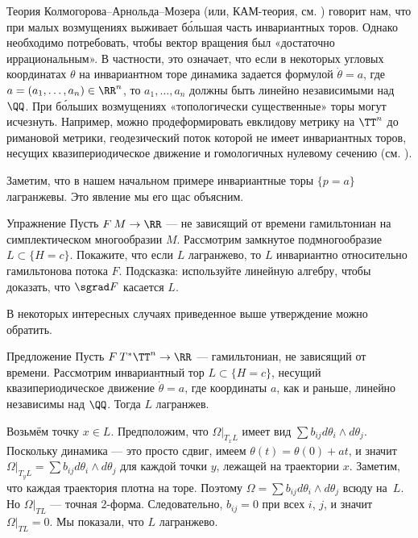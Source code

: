 Теория Колмогорова--Арнольда--Мозера (или, КАМ-теория, см. \cite{Ar}) говорит нам, что при малых возмущениях выживает б\'{о}льшая часть инвариантных торов.
Однако необходимо потребовать, чтобы вектор вращения был «достаточно иррациональным».
В частности, это означает, что если в некоторых угловых координатах $\theta$ на инвариантном торе динамика задается формулой $\dot\theta = a$, где $a = (a_1 ,\dots, a_n) \in \RR^n$, то $a_1 ,\dots, a_n$ должны быть линейно независимыми над $\QQ$.
При б\'{о}льших возмущениях «топологически существенные» торы могут исчезнуть.
Например, можно продеформировать евклидову метрику на $\TT^n$ до римановой метрики, геодезический поток которой не имеет инвариантных торов, несущих квазипериодическое движение и гомологичных нулевому сечению (см. \cite{AL}).

Заметим, что в нашем начальном примере инвариантные торы $\{p = a\}$ лагранжевы.
Это явление мы его щас объясним.

\begin{thm}{Упражнение}\label{8.1.A}
Пусть $F\: M \to \RR$ --- не зависящий от времени гамильтониан на симплектическом многообразии $M$.
Рассмотрим замкнутое подмногообразие $L \subset \{H = c\}$.
Покажите, что если $L$ лагранжево, то $L$ инвариантно относительно гамильтонова потока $F$.
Подсказка: используйте линейную алгебру, чтобы доказать, что $\sgrad F$ касается $L$.
\end{thm}

В некоторых интересных случаях приведенное выше утверждение можно обратить.

\begin{thm}[(\cite{He})]{Предложение}\label{8.1.B}
Пусть $F\: T^\ast \TT^n \to \RR$ --- гамильтониан, не зависящий от времени.
Рассмотрим инвариантный тор $L \subset \{H = c\}$, несущий
квазипериодическое движение $\dot\theta = a$, где координаты $a$, как и раньше, линейно независимы над $\QQ$.
Тогда $L$ лагранжев.
\end{thm}

Возьмём точку $x \in L$.
Предположим, что $\Omega|_{T_x L}$ имеет вид $\sum b_{ij} d\theta_i \wedge d\theta_j$.
Поскольку динамика --- это просто сдвиг, имеем $\theta (t) = \theta (0) + at$, и значит $\Omega|_{T_y L} = \sum b_{ij} d\theta_i \wedge d\theta_j$ для каждой точки $y$, лежащей на траектории $x$.
Заметим, что каждая траектория плотна на торе.
Поэтому $\Omega = \sum b_{ij} d\theta_i \wedge d\theta_j$ всюду на~$L$.
Но $\Omega|_{TL}$ --- точная 2-форма.
Следовательно, $b_{ij} = 0$ при всех $i$, $j$, и значит $\Omega|_{T L} = 0$. 
Мы показали, что $L$ лагранжево.
\qeds

